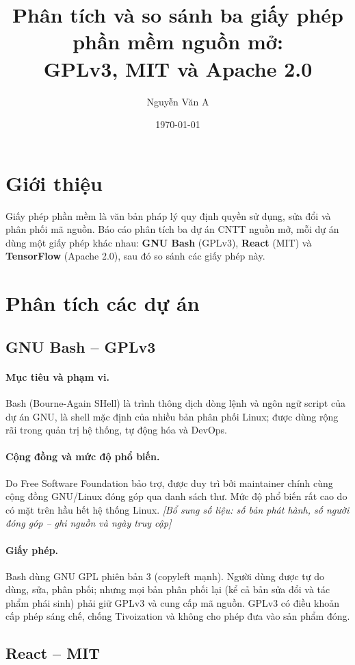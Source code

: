 \documentclass[12pt,a4paper]{article}
\title{Phân tích và so sánh ba giấy phép phần mềm nguồn mở:\\GPLv3, MIT và Apache 2.0}
\author{Nguyễn Văn A}
\date{\today}
\begin{document}
\maketitle
\tableofcontents
\newpage

\section{Giới thiệu}
Giấy phép phần mềm là văn bản pháp lý quy định quyền sử dụng, sửa đổi và phân phối mã nguồn. Báo cáo phân tích ba dự án CNTT nguồn mở, mỗi dự án dùng một giấy phép khác nhau: \textbf{GNU Bash} (GPLv3), \textbf{React} (MIT) và \textbf{TensorFlow} (Apache 2.0), sau đó so sánh các giấy phép này.

\section{Phân tích các dự án}

\subsection{GNU Bash -- GPLv3}
\paragraph{Mục tiêu và phạm vi.} Bash (Bourne-Again SHell) là trình thông dịch dòng lệnh và ngôn ngữ script của dự án GNU, là shell mặc định của nhiều bản phân phối Linux; được dùng rộng rãi trong quản trị hệ thống, tự động hóa và DevOps.
\paragraph{Cộng đồng và mức độ phổ biến.} Do Free Software Foundation bảo trợ, được duy trì bởi maintainer chính cùng cộng đồng GNU/Linux đóng góp qua danh sách thư. Mức độ phổ biến rất cao do có mặt trên hầu hết hệ thống Linux. \textit{[Bổ sung số liệu: số bản phát hành, số người đóng góp -- ghi nguồn và ngày truy cập]}
\paragraph{Giấy phép.} Bash dùng GNU GPL phiên bản 3 (copyleft mạnh). Người dùng được tự do dùng, sửa, phân phối; nhưng mọi bản phân phối lại (kể cả bản sửa đổi và tác phẩm phái sinh) phải giữ GPLv3 và cung cấp mã nguồn. GPLv3 có điều khoản cấp phép sáng chế, chống Tivoization và không cho phép đưa vào sản phẩm đóng.

\subsection{React -- MIT}
\end{document}
